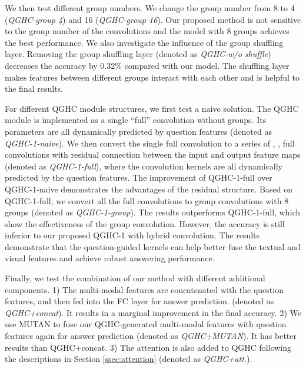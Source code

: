 \documentclass[runningheads]{llncs}
\begin{document}
We then test different group numbers. We change the group number from 8 to 4 (\emph{QGHC-group 4}) and 16 (\emph{QGHC-group 16}). Our proposed method is not sensitive to the group number of the convolutions and the model with 8 groups achieves the best performance. 
We also investigate the influence of the group shuffling layer.
Removing the group shuffling layer (denoted as \emph{QGHC-w/o shuffle}) decreases the accuracy by 0.32\% compared with our model. The shuffling layer makes features between different groups interact with each other and is helpful to the final results.

For different QGHC module structures, we first test a naive solution. The QGHC module is implemented as a single  ``full'' convolution without groups. Its parameters are all dynamically predicted by question features (denoted as \emph{QGHC-1-naive}). We then convert the single  full convolution to a series of , ,  full convolutions with residual connection between the input and output feature maps (denoted as \emph{QGHC-1-full}), where the  convolution kernels are all dynamically predicted by the question features. The improvement of QGHC-1-full over QGHC-1-naive demonstrates the advantages of the residual structure. Based on QGHC-1-full, we convert all the full convolutions to group convolutions with 8 groups (denoted as \emph{QGHC-1-group}). The results outperforms QGHC-1-full, which show the effectiveness of the group convolution. 
However, the accuracy is still inferior to our proposed QGHC-1 with hybrid convolution. The results demonstrate that the question-guided kernels can help better fuse the textual and visual features and achieve robust answering performance. 

Finally, we test the combination of our method with different additional components. 1) The multi-modal features are concatenated with the question features, and then fed into the FC layer for answer prediction. (denoted as \emph{QGHC+concat}). It results in a marginal improvement in the final accuracy. 2) We use MUTAN \cite{ben2017mutan} to fuse our QGHC-generated multi-modal features with question features again for answer prediction (denoted as \emph{QGHC+MUTAN}). It has better results than QGHC+concat. 3) The attention is also added to QGHC following the descriptions in Section \ref{ssec:attention} (denoted as \emph{QGHC+att.}).
\end{document}
